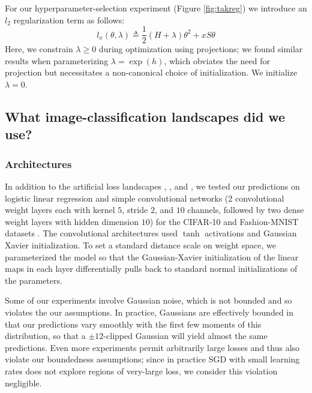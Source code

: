             For our hyperparameter-selection experiment (Figure
            \ref{fig:takreg}) we introduce an $l_2$
            regularization term as follows:
            $$
                l_x(\theta, \lambda)
                \triangleq
                \frac{1}{2} (H + \lambda) \theta^2 + x S \theta
            $$
            Here, we constrain $\lambda\geq 0$ during optimization using
            projections; we found similar results when parameterizing $\lambda
            = \exp(h)$, which obviates the need for projection but necessitates
            a non-canonical choice of initialization.  We initialize
            $\lambda=0$.

    \subsection{What image-classification landscapes did we use?}   \label{appendix:natural}

        \subsubsection{Architectures}
            In addition to the artificial loss landscapes
                \Gauss, \Helix, and \MeanEstimation, 
                we tested our predictions on logistic linear regression
                and simple convolutional networks (2 convolutional weight layers
                each with kernel $5$, stride $2$, and $10$ channels, followed by
                two dense weight layers with hidden dimension $10$) for the
                CIFAR-10 \cite{kr09} and Fashion-MNIST datasets \cite{xi17}.  The
                convolutional architectures used $\tanh$ activations and Gaussian
                Xavier initialization.  To set a standard distance scale on weight
                space, we parameterized the model so that the
                Gaussian-Xavier initialization of the linear maps in each layer
                differentially pulls back to standard normal initializations of the
                parameters.

                Some of our experiments involve Gaussian noise, which is not
                bounded and so violates the our assumptions.  In practice,
                Gaussians are effectively bounded in that our predictions vary
                smoothly with the first few moments of this distribution, so
                that a $\pm 12$-clipped Gaussian will yield almost the same
                predictions.
                Even more experiments permit arbitrarily large losses and  
                thus also violate our boundedness assumptions; since in practice
                SGD with small learning rates does not explore regions of
                very-large loss, we consider this violation negligible.

